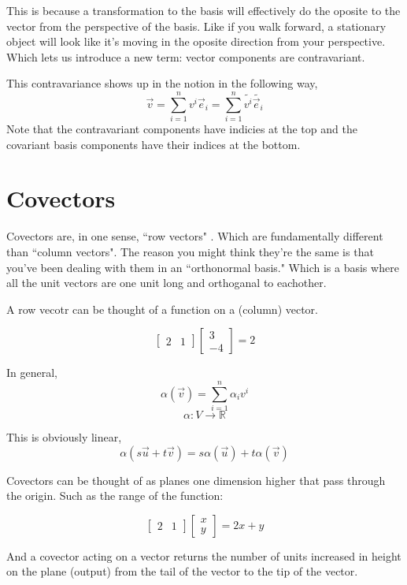 \documentclass[12pt]{book}
\theoremstyle{plain}
\theoremstyle{definition}
\theoremstyle{ppart}
\theoremstyle{case}
\theoremstyle{solution}
\begin{document}
This is because \cite{youtube:tensor3} a transformation to the basis will effectively do the oposite to the vector from the perspective of the basis.
Like if you walk forward, a stationary object will look like it's moving in the oposite direction from your perspective.
Which lets us introduce a new term: vector components are contravariant.

This contravariance shows up in the notion in the following way,
\[ \vec{v} = \sum_{i=1}^n v^i \vec{e}_i = \sum_{i=1}^n \widetilde{v^i} \widetilde{\vec{e}_i} \]
Note that the contravariant components have indicies at the top and the covariant basis components have their indices at the bottom.

\chapter{Covectors}

Covectors are, in one sense, ``row vectors" \cite{youtube:tensor4}. Which are fundamentally different than ``column vectors".
The reason you might think they're the same is that you've been dealing with them in an ``orthonormal basis." Which is a basis
where all the unit vectors are one unit long and orthoganal to eachother.

A row vecotr can be thought of a function on a (column) vector.

\[
  \begin{bmatrix}
  2 & 1
  \end{bmatrix}
  \begin{bmatrix}
  3 \\ -4
  \end{bmatrix}
  = 2
\]

In general,
\[ \alpha(\vec{v}) = \sum_{i=1}^n \alpha_i v^i \]
\[ \alpha : V \to \mathbb{R} \]

This is obviously linear,
\[ \alpha(s \vec{u} + t \vec{v}) = s \alpha(\vec{u}) + t \alpha(\vec{v}) \]

Covectors can be thought of as planes one dimension higher that pass through the origin. Such as the range of the function:

\[
  \begin{bmatrix}
  2 & 1
  \end{bmatrix}
  \begin{bmatrix}
  x \\ y
  \end{bmatrix}
  = 2x+y
\]

And a covector acting on a vector returns the number of units increased in height on the plane
(output) from the tail of the vector to the tip of the vector.
\end{document}
